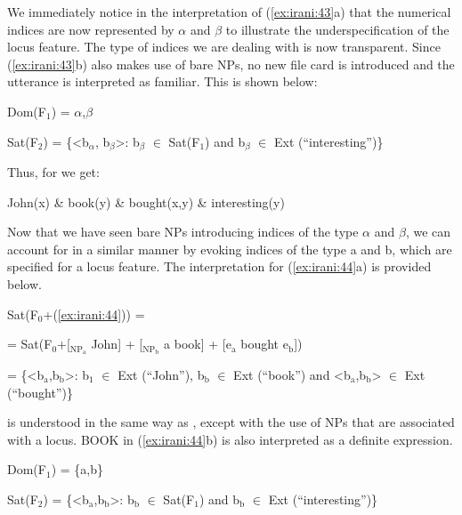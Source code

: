 \documentclass[output=paper,
modfonts
]{langscibook}
\begin{document}
We immediately notice in the interpretation of (\ref{ex:irani:43}a) that the numerical indices are now represented by \(\alpha\) and \(\beta\) to illustrate the underspecification of the locus feature. The type of indices we are dealing with is now transparent. Since (\ref{ex:irani:43}b) also makes use of bare NPs, no new file card is introduced and the utterance is interpreted as familiar. This is shown below: \par 

\begin{exe}

\ex Dom(F$_1$) = {$\alpha$,$\beta$} \par 
Sat(F$_2$) = \{<b$_{\alpha}$, b$_{\beta}$>: b$_{\beta}$ \(\in\) Sat(F$_1$) and b$_{\beta}$ \(\in\) Ext (``interesting'')\} \par 

\end{exe}

Thus, for  we get:

\begin{exe}

\ex John(x) \& book(y) \& bought(x,y) \& interesting(y)

\end{exe}

Now that we have seen bare NPs introducing indices of the type \(\alpha\) and \(\beta\), we can account for  in a similar manner by evoking indices of the type a and b, which are specified for a locus feature.  The interpretation for (\ref{ex:irani:44}a) is provided below.

\begin{exe}

\ex Sat(F$_0$+(\ref{ex:irani:44})) = \par 
= Sat(F$_0$+[$_{\text{NP}_\text{a}}$ John] + [$_{\text{NP}_\text{b}}$ a book] + [e$_\text{a}$ bought e$_\text{b}$])\par 
= \{<b$_\text{a}$,b$_\text{b}$>: b$_1$ \(\in\) Ext (``John''), b$_\text{b}$ \(\in\) Ext (``book'') and <b$_\text{a}$,b$_\text{b}$> \(\in\) Ext \\ (``bought'')\}  

\end{exe}

 is understood in the same way as , except with the use of NPs that are associated with a locus. BOOK in (\ref{ex:irani:44}b) is also interpreted as a definite expression. 

\begin{exe}

\ex Dom(F$_1$) = \{a,b\} \par 
Sat(F$_2$) = \{<b$_\text{a}$,b$_\text{b}$>: b$_\text{b}$ \(\in\) Sat(F$_1$) and b$_\text{b}$ \(\in\) Ext (``interesting'')\} \par 

\end{exe}
\end{document}
